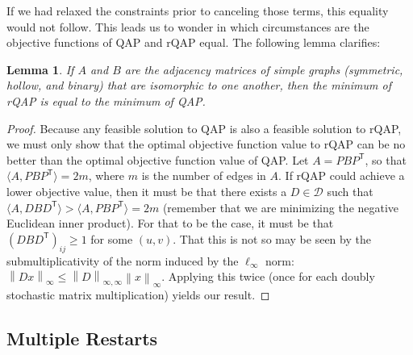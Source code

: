 \documentclass[11pt]{article}
\providecommand{\norm}[1]{\left \lVert#1 \right  \rVert}
\newcommand{\T}{^{\ensuremath{\mathsf{T}}}}           %
\newtheorem{lem}{Lemma}
\providecommand{\mc}[1]{\mathcal{#1}}
\begin{document}
If we had relaxed the constraints prior to canceling those terms, this equality would not follow.  This leads us to wonder in which circumstances are the objective functions of QAP and rQAP equal.  The following lemma clarifies:
\begin{lem}
	If $A$ and $B$ are the adjacency matrices of simple graphs (symmetric, hollow, and binary) that are isomorphic to one another, then the minimum of rQAP is equal to the minimum of QAP.
\end{lem}
\begin{proof}
Because any feasible solution to QAP is also a feasible solution to rQAP, we must only show that the optimal objective function value to rQAP can be no better than the optimal objective function value of QAP.  Let $A=PBP\T$, so that $\langle A, PBP\T\rangle=2m$, where $m$ is the number of edges in $A$.  If rQAP could achieve a lower objective value, then it must be that there exists a $D \in \mc{D}$ such that $\langle A, DBD\T\rangle > \langle A, PBP\T\rangle = 2m$ (remember that we are minimizing the negative Euclidean inner product). For that to be the case, it must be that $(DBD\T)_{ij} \geq 1$ for some $(u,v)$.  That this is not so may be seen by the submultiplicativity of the norm induced by the $\ell_{\infty}$ norm:
$\norm{Dx}_\infty \leq \norm{D}_{\infty,\infty} \norm{x}_\infty$.  Applying this twice (once for each doubly stochastic matrix multiplication) yields our result.
\end{proof}







\subsection{Multiple Restarts} %
\label{sub:multiple_restarts}
\end{document}
